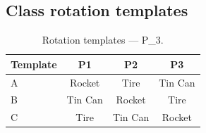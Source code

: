 \documentclass[a4]{article}
\begin{document}
\subsection*{Class rotation templates}

\begin{table}[H]
\centering
\begin{tabular}{lccc}
\toprule
\textbf{Template} & \textbf{P1} & \textbf{P2} & \textbf{P3} \\
\midrule
A & Rocket & Tire & Tin Can \\
B & Tin Can & Rocket & Tire \\
C & Tire & Tin Can & Rocket \\
\bottomrule
\end{tabular}
\caption{Rotation templates --- P\_3.}
\end{table}
\end{document}
